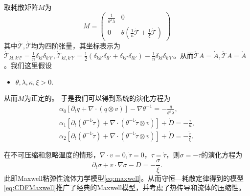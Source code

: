 	取耗散矩阵$M$为
	\begin{equation*}
		M = \left( \begin{array}{ccc} 
			\frac{1}{\theta^2 \lambda} & 0 \\
			0 &  \theta(\frac{1}{\kappa} \dot{\mathcal{T}} + \frac{1}{\xi} \mathring{\mathcal{T}})  
		\end{array} \right)
	\end{equation*}
	其中$\dot{\mathcal{T}}, \mathring{\mathcal{T}}$均为四阶张量，其坐标表示为$\dot{\mathcal{T}}_{kl,k'l'} = \frac{1}{n}\delta_{kl} \delta_{k'l'}, \mathring{\mathcal{T}}_{kl,k'l'} =\frac{1}{2}(\delta_{kk'}\delta_{ll'} + \delta_{kl'} \delta_{lk'} ) -\frac{1}{n}\delta_{kl} \delta_{k'l'} $。从而$\dot{\mathcal{T}} A = \dot{A},\mathring{\mathcal{T}} A = \mathring{A}$。我们这里假设
	\begin{itemize}
		\item $\theta,\lambda,\kappa,\xi > 0$.
	\end{itemize}
	从而$M$为正定的。
	于是我们可以得到系统的演化方程为\cite{zhu2014conservation}
	\begin{subequations}\label{eq:CDFMaxwell}
		\begin{align}
			\alpha_0 [\partial_t q +  \nabla \cdot (q \otimes v)] - \nabla \theta^{-1} = -\frac{q}{\theta^2 \lambda}, \\
			\alpha_1[\partial_t (\theta^{-1} \dot{\tau}) + \nabla \cdot (\theta^{-1} \dot{\tau} \otimes v)] + \dot{D} = -\frac{\dot{\tau}}{\kappa}, \\
			\alpha_2[\partial_t (\theta^{-1} \mathring{\tau}) + \nabla \cdot (\theta^{-1} \mathring{\tau} \otimes v)] + \mathring{D} = -\frac{\mathring{\tau}}{\xi}. 
		\end{align}
	\end{subequations}


	在不可压缩和忽略温度的情形，$\nabla \cdot v = 0, \dot{\tau}=0$，$\tau = \mathring{\tau}$，则$\sigma = -\tau$的演化方程为
	\begin{equation*}
		\partial_t \sigma + v \cdot \nabla \sigma - D = -\frac{\sigma}{\xi}. 
	\end{equation*}
	此即Maxwell粘弹性流体力学模型\eqref{eq:maxwell}。从而守恒—耗散定律得到的模型\eqref{eq:CDFMaxwell}推广了经典的Maxwell模型，并考虑了热传导和流体的压缩性。	

